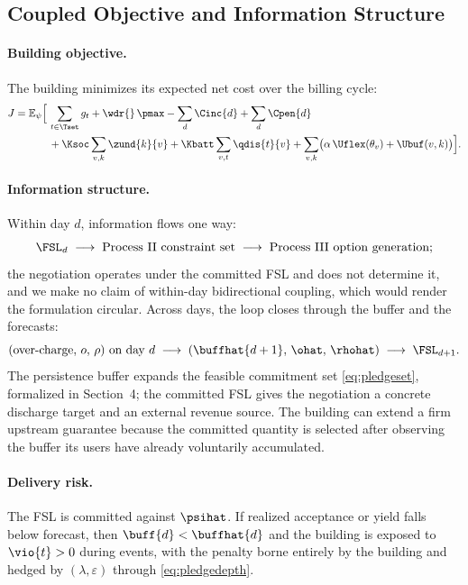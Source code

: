 \subsection{Coupled Objective and Information Structure}\label{sec:coupled}

\paragraph{Building objective.} The building minimizes its expected net
cost over the billing cycle:
\begin{equation}\label{eq:J}
\begin{aligned}
J = \mathbb{E}_{\psi}\Bigl[\,
&\sum_{t \in \Tset} g_t + \wdr{}\,\pmax
- \sum_{d} \Cinc{d} + \sum_{d} \Cpen{d} \\
&+ \Ksoc \sum_{v,k} \zund{k}{v}
+ \Kbatt \sum_{v,t} \qdis{t}{v}
+ \sum_{v,k} \bigl(\alpha\,\Uflex(\theta_v) + \Ubuf(v,k)\bigr)
\Bigr].
\end{aligned}
\end{equation}

\paragraph{Information structure.} Within day $d$, information flows
one way:
\begin{equation*}
\FSL_d \;\longrightarrow\; \text{Process II constraint set}
\;\longrightarrow\; \text{Process III option generation};
\end{equation*}
the negotiation operates under the committed FSL and does not determine it, and
we make no claim of within-day bidirectional coupling, which would
render the formulation circular. Across days, the loop closes through
the buffer and the forecasts:
\begin{equation*}
(\text{over-charge},\, o,\, \rho)\ \text{on day } d
\;\longrightarrow\; (\buffhat{d+1},\, \ohat,\, \rhohat)
\;\longrightarrow\; \FSL_{d+1}.
\end{equation*}
The persistence buffer expands the feasible commitment set
\eqref{eq:pledgeset}, formalized in Section~4; the committed FSL gives the
negotiation a concrete discharge target and an external revenue source.
The building can extend a firm upstream guarantee because the committed
quantity is selected after observing the buffer its users have already
voluntarily accumulated.

\paragraph{Delivery risk.} The FSL is committed against $\psihat$. If
realized acceptance or yield falls below forecast, then $\buff{d} <
\buffhat{d}$ and the building is exposed to $\vio{t} > 0$ during events,
with the penalty borne entirely by the building and hedged by
$(\lambda, \varepsilon)$ through \eqref{eq:pledgedepth}.

